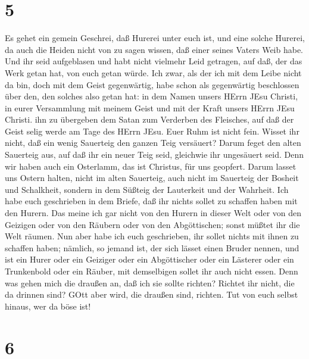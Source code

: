\hypertarget{section-4}{%
\section{5}\label{section-4}}

 Es gehet ein gemein Geschrei, daß Hurerei unter euch ist,
und eine solche Hurerei, da auch die Heiden nicht von zu sagen wissen,
daß einer seines Vaters Weib habe.  Und ihr seid aufgeblasen
und habt nicht vielmehr Leid getragen, auf daß, der das Werk getan hat,
von euch getan würde.  Ich zwar, als der ich mit dem Leibe
nicht da bin, doch mit dem Geist gegenwärtig, habe schon als gegenwärtig
beschlossen über den, den solches also getan hat:  in dem
Namen unsers HErrn JEsu Christi, in eurer Versammlung mit meinem Geist
und mit der Kraft unsers HErrn JEsu Christi.  ihn zu
übergeben dem Satan zum Verderben des Fleisches, auf daß der Geist selig
werde am Tage des HErrn JEsu.  Euer Ruhm ist nicht fein.
Wisset ihr nicht, daß ein wenig Sauerteig den ganzen Teig versäuert?
 Darum feget den alten Sauerteig aus, auf daß ihr ein neuer
Teig seid, gleichwie ihr ungesäuert seid. Denn wir haben auch ein
Osterlamm, das ist Christus, für uns geopfert.  Darum lasset
uns Ostern halten, nicht im alten Sauerteig, auch nicht im Sauerteig der
Bosheit und Schalkheit, sondern in dem Süßteig der Lauterkeit und der
Wahrheit.  Ich habe euch geschrieben in dem Briefe, daß ihr
nichts sollet zu schaffen haben mit den Hurern.  Das meine
ich gar nicht von den Hurern in dieser Welt oder von den Geizigen oder
von den Räubern oder von den Abgöttischen; sonst müßtet ihr die Welt
räumen.  Nun aber habe ich euch geschrieben, ihr sollet
nichts mit ihnen zu schaffen haben; nämlich, so jemand ist, der sich
lässet einen Bruder nennen, und ist ein Hurer oder ein Geiziger oder ein
Abgöttischer oder ein Lästerer oder ein Trunkenbold oder ein Räuber, mit
demselbigen sollet ihr auch nicht essen.  Denn was gehen
mich die draußen an, daß ich sie sollte richten? Richtet ihr nicht, die
da drinnen sind?  GOtt aber wird, die draußen sind,
richten. Tut von euch selbst hinaus, wer da böse ist!

\hypertarget{section-5}{%
\section{6}\label{section-5}}

